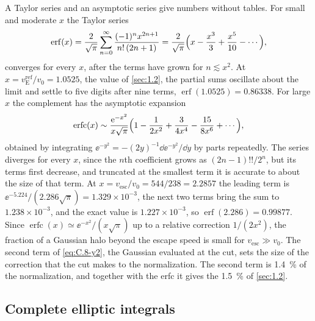 A Taylor series and an asymptotic series give numbers without tables. For small and moderate $x$ the Taylor series~\cite[Eq.~(7.6.1)]{olver2010nist}
\begin{equation}
  \operatorname{erf}(x) = \frac{2}{\sqrt\pi}\sum_{n=0}^{\infty}\frac{(-1)^nx^{2n+1}}{n!\,(2n + 1)} = \frac{2}{\sqrt\pi}\Bigl(x - \frac{x^3}{3} + \frac{x^5}{10} - \cdots\Bigr) ,
  \label{eq:C.8-series}
\end{equation}
converges for every $x$, after the terms have grown for $n \lesssim x^2$. At $x = v_{\mathrm{E}}^{\mathrm{ref}}/v_0 = 1.0525$, the value of \cref{sec:1.2}, the partial sums oscillate about the limit and settle to five digits after nine terms, $\operatorname{erf}(1.0525) = 0.86338$. For large $x$ the complement has the asymptotic expansion~\cite[Eq.~(7.12.1)]{olver2010nist}
\begin{equation}
  \operatorname{erfc}(x) \sim \frac{\mathrm{e}^{-x^2}}{x\sqrt\pi}\Bigl(1 - \frac{1}{2x^2} + \frac{3}{4x^4} - \frac{15}{8x^6} + \cdots\Bigr) ,
  \label{eq:C.8-asymptotic}
\end{equation}
obtained by integrating $\ee^{-y^2} = -(2y)^{-1}\dd\ee^{-y^2}/\dd y$ by parts repeatedly. The series diverges for every $x$, since the $n$th coefficient grows as $(2n - 1)!!/2^n$, but its terms first decrease, and truncated at the smallest term it is accurate to about the size of that term. At $x = v_{\mathrm{esc}}/v_0 = 544/238 = 2.2857$ the leading term is $\ee^{-5.224}/(2.286\sqrt\pi) = 1.329\times10^{-3}$, the next two terms bring the sum to $1.238\times10^{-3}$, and the exact value is $1.227\times10^{-3}$, so $\operatorname{erf}(2.286) = 0.99877$. Since $\operatorname{erfc}(x) \simeq \ee^{-x^2}/(x\sqrt\pi)$ up to a relative correction $1/(2x^2)$, the fraction of a Gaussian halo beyond the escape speed is small for $v_{\mathrm{esc}} \gg v_0$. The second term of \cref{eq:C.8-y2}, the Gaussian evaluated at the cut, sets the size of the correction that the cut makes to the normalization. The second term is \SI{1.4}{\percent} of the normalization, and together with the erfc it gives the \SI{1.5}{\percent} of \cref{sec:1.2}.

\subsection{Complete elliptic integrals}


